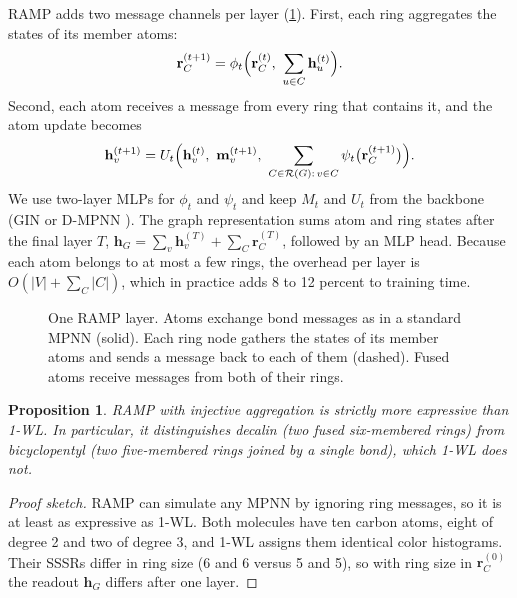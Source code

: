 \documentclass[11pt]{article}
\newtheorem{proposition}{Proposition}
\newcommand{\R}{\mathcal{R}}
\newcommand{\h}{\mathbf{h}}
\newcommand{\rr}{\mathbf{r}}
\begin{document}
RAMP adds two message channels per layer (\cref{fig:ramp}). First, each ring aggregates the states of its member atoms:
\begin{equation}
  \rr_C^{(t+1)} = \phi_t\Bigl(\rr_C^{(t)},\ \sum_{u \in C} \h_u^{(t)}\Bigr).
  \label{eq:ring-update}
\end{equation}
Second, each atom receives a message from every ring that contains it, and the atom update becomes
\begin{equation}
  \h_v^{(t+1)} = U_t\Bigl(\h_v^{(t)},\ \mathbf{m}_v^{(t+1)},\ \sum_{C \in \R(G):\, v \in C} \psi_t\bigl(\rr_C^{(t+1)}\bigr)\Bigr).
  \label{eq:atom-update}
\end{equation}
We use two-layer MLPs for $\phi_t$ and $\psi_t$ and keep $M_t$ and $U_t$ from the backbone (GIN \cite{xu2019} or D-MPNN \cite{yang2019}). The graph representation sums atom and ring states after the final layer $T$, $\h_G = \sum_{v} \h_v^{(T)} + \sum_{C} \rr_C^{(T)}$, followed by an MLP head. Because each atom belongs to at most a few rings, the overhead per layer is $O(|V| + \sum_C |C|)$, which in practice adds 8 to 12 percent to training time.

\begin{figure}[t]
  \centering
  
  \caption{One RAMP layer. Atoms exchange bond messages as in a standard MPNN (solid). Each ring node gathers the states of its member atoms and sends a message back to each of them (dashed). Fused atoms receive messages from both of their rings.}
  \label{fig:ramp}
\end{figure}

\begin{proposition}
\label{prop:expressive}
RAMP with injective aggregation is strictly more expressive than 1-WL. In particular, it distinguishes decalin (two fused six-membered rings) from bicyclopentyl (two five-membered rings joined by a single bond), which 1-WL does not.
\end{proposition}

\begin{proof}[Proof sketch]
RAMP can simulate any MPNN by ignoring ring messages, so it is at least as expressive as 1-WL. Both molecules have ten carbon atoms, eight of degree 2 and two of degree 3, and 1-WL assigns them identical color histograms. Their SSSRs differ in ring size (6 and 6 versus 5 and 5), so with ring size in $\rr_C^{(0)}$ the readout $\h_G$ differs after one layer.
\end{proof}
\end{document}
